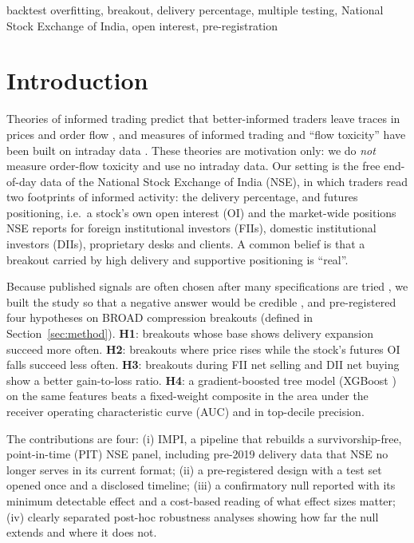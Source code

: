\documentclass[conference]{IEEEtran}
\begin{document}
\begin{IEEEkeywords}
backtest overfitting, breakout, delivery percentage, multiple testing, National Stock Exchange of India, open
interest, pre-registration
\end{IEEEkeywords}

\section{Introduction}
Theories of informed trading predict that better-informed traders leave traces in prices and order flow
\cite{kyle1985,glosten1985}, and measures of informed trading and ``flow toxicity'' have been built on
intraday data \cite{easley1996,easley2012}. These theories are motivation only: we do \emph{not} measure
order-flow toxicity and use no intraday data. Our setting is the free end-of-day data of the National Stock
Exchange of India (NSE), in which traders read two footprints of informed activity: the delivery percentage,
and futures positioning, i.e.\ a stock's own open interest (OI) and the market-wide positions NSE reports for
foreign institutional investors (FIIs), domestic institutional investors (DIIs), proprietary desks and
clients. A common belief is that a breakout carried by high delivery and supportive positioning is ``real''.

Because published signals are often chosen after many specifications are tried \cite{harvey2016,bailey2014pseudo},
we built the study so that a negative answer would be credible \cite{nosek2018}, and pre-registered four
hypotheses on BROAD compression breakouts (defined in Section~\ref{sec:method}). \textbf{H1}: breakouts whose
base shows delivery expansion succeed more often. \textbf{H2}: breakouts where price rises while the stock's
futures OI falls succeed less often. \textbf{H3}: breakouts during FII net selling and DII net buying show a
better gain-to-loss ratio. \textbf{H4}: a gradient-boosted tree model (XGBoost \cite{chen2016}) on the same
features beats a fixed-weight composite in the area under the receiver operating characteristic curve (AUC)
and in top-decile precision.

The contributions are four: (i) IMPI, a pipeline that rebuilds a survivorship-free, point-in-time (PIT)
NSE panel, including pre-2019 delivery data that NSE no longer serves in its current format; (ii) a
pre-registered design with a test set opened once and a disclosed timeline; (iii) a confirmatory null
reported with its minimum detectable effect and a cost-based reading of what effect sizes matter; (iv) clearly
separated post-hoc robustness analyses showing how far the null extends and where it does not.
\end{document}
